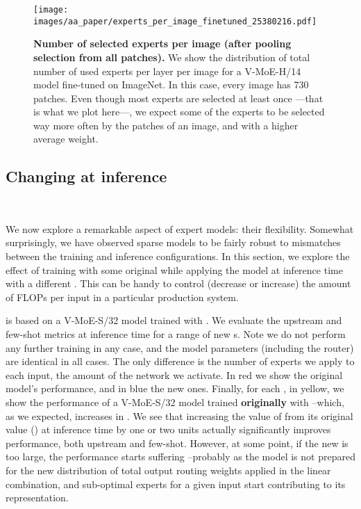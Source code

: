 \documentclass{article}
\newcommand{\abbv}{{V-MoE}}
\begin{document}
\begin{figure}[h]
\centering
\texttt{[image: images/aa\_paper/experts\_per\_image\_finetuned\_25380216.pdf]}
\caption{
\textbf{Number of selected experts per image (after pooling selection from all patches).}
We show the distribution of total number of used experts per layer per image for a \abbv{}-H/14 model fine-tuned on ImageNet.
In this case, every image has 730 patches.
Even though most experts are selected at least once ---that is what we plot here---, we expect some of the experts to be selected way more often by the patches of an image, and with a higher average weight.
}
\label{im:experts_per_image}
\end{figure}

\clearpage

\subsection{Changing \texorpdfstring{}{k} at inference}\
\label{app_analysis_routing_changing_k}

We now explore a remarkable aspect of expert models: their flexibility.
Somewhat surprisingly, we have observed sparse models to be fairly robust to mismatches between the training and inference configurations.
In this section, we explore the effect of training with some original  while applying the model at inference time with a different .
This can be handy to control (decrease or increase) the amount of FLOPs per input in a particular production system.

 is based on a \abbv{}-S/32 model trained with .
We evaluate the upstream and few-shot metrics at inference time for a range of new s.
Note we do not perform any further training in any case, and the model parameters (including the router) are identical in all cases.
The only difference is the number of experts we apply to each input, the amount of the network we activate.
In red we show the original model's performance, and in blue the new ones.
Finally, for each , in yellow, we show the performance of a \abbv{}-S/32 model trained \textbf{originally} with  --which, as we expected, increases in .
We see that increasing the value of  from its original value () at inference time by one or two units actually significantly improves performance, both upstream and few-shot.
However, at some point, if the new  is too large, the performance starts suffering --probably as the model is not prepared for the new distribution of total output routing weights applied in the linear combination, and sub-optimal experts for a given input start contributing to its representation.
\end{document}
